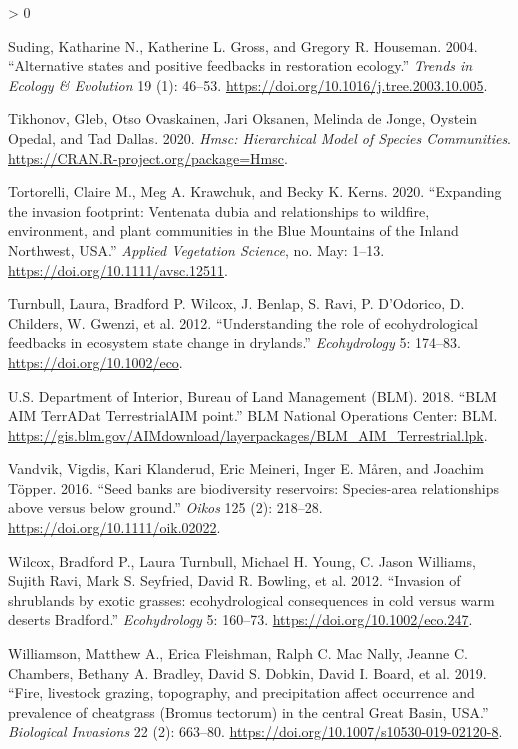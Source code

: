 \documentclass[
  12pt,
]{article}
\newlength{\cslhangindent}
\newenvironment{CSLReferences}[2] %
 {%
  \setlength{\parindent}{0pt}
  \ifodd #1 \everypar{\setlength{\hangindent}{\cslhangindent}}\ignorespaces\fi
  \ifnum #2 > 0
  \setlength{\parskip}{#2\baselineskip}
  \fi
 }%
 {}
\begin{document}
\begin{CSLReferences}{1}{0}
\leavevmode\hypertarget{ref-Suding2004}{}%
Suding, Katharine N., Katherine L. Gross, and Gregory R. Houseman. 2004.
{``{Alternative states and positive feedbacks in restoration
ecology}.''} \emph{Trends in Ecology \& Evolution} 19 (1): 46--53.
\url{https://doi.org/10.1016/j.tree.2003.10.005}.

\leavevmode\hypertarget{ref-HMSC}{}%
Tikhonov, Gleb, Otso Ovaskainen, Jari Oksanen, Melinda de Jonge, Oystein
Opedal, and Tad Dallas. 2020. \emph{Hmsc: Hierarchical Model of Species
Communities}. \url{https://CRAN.R-project.org/package=Hmsc}.

\leavevmode\hypertarget{ref-Tortorelli2020}{}%
Tortorelli, Claire M., Meg A. Krawchuk, and Becky K. Kerns. 2020.
{``{Expanding the invasion footprint: Ventenata dubia and relationships
to wildfire, environment, and plant communities in the Blue Mountains of
the Inland Northwest, USA}.''} \emph{Applied Vegetation Science}, no.
May: 1--13. \url{https://doi.org/10.1111/avsc.12511}.

\leavevmode\hypertarget{ref-Turnbull2012}{}%
Turnbull, Laura, Bradford P. Wilcox, J. Benlap, S. Ravi, P. D'Odorico,
D. Childers, W. Gwenzi, et al. 2012. {``{Understanding the role of
ecohydrological feedbacks in ecosystem state change in drylands}.''}
\emph{Ecohydrology} 5: 174--83. \url{https://doi.org/10.1002/eco}.

\leavevmode\hypertarget{ref-AIM}{}%
U.S. Department of Interior, Bureau of Land Management (BLM). 2018.
{``{BLM AIM TerrADat TerrestrialAIM point}.''} BLM National Operations
Center: BLM.
\url{https://gis.blm.gov/AIMdownload/layerpackages/BLM_AIM_Terrestrial.lpk}.

\leavevmode\hypertarget{ref-Vandvik2016}{}%
Vandvik, Vigdis, Kari Klanderud, Eric Meineri, Inger E. Måren, and
Joachim Töpper. 2016. {``{Seed banks are biodiversity reservoirs:
Species-area relationships above versus below ground}.''} \emph{Oikos}
125 (2): 218--28. \url{https://doi.org/10.1111/oik.02022}.

\leavevmode\hypertarget{ref-Wilcox2012}{}%
Wilcox, Bradford P., Laura Turnbull, Michael H. Young, C. Jason
Williams, Sujith Ravi, Mark S. Seyfried, David R. Bowling, et al. 2012.
{``{Invasion of shrublands by exotic grasses: ecohydrological
consequences in cold versus warm deserts Bradford}.''}
\emph{Ecohydrology} 5: 160--73. \url{https://doi.org/10.1002/eco.247}.

\leavevmode\hypertarget{ref-Williamson2019}{}%
Williamson, Matthew A., Erica Fleishman, Ralph C. Mac Nally, Jeanne C.
Chambers, Bethany A. Bradley, David S. Dobkin, David I. Board, et al.
2019. {``{Fire, livestock grazing, topography, and precipitation affect
occurrence and prevalence of cheatgrass (Bromus tectorum) in the central
Great Basin, USA}.''} \emph{Biological Invasions} 22 (2): 663--80.
\url{https://doi.org/10.1007/s10530-019-02120-8}.


\end{CSLReferences}
\end{document}
